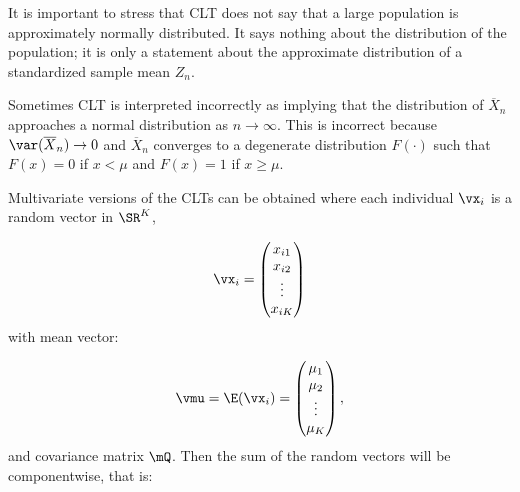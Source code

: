 \documentclass[english,12pt]{book}\usepackage[]{graphicx}\usepackage[]{xcolor}
\begin{document}
It is important to stress that CLT does not say that a large population is approximately normally distributed. It says nothing about the distribution of the population; it is only a statement about the approximate distribution of a standardized sample mean $Z_n$. 

\begin{remark}
  Sometimes CLT is interpreted incorrectly as implying that the distribution of $\overline{X}_n$ approaches a normal distribution as $n\to \infty$. This is incorrect because $\var(\overline{X}_n)\to 0$ and $\overline{X}_n$ converges to a degenerate distribution $F(\cdot)$ such that $F(x) = 0$ if $x < \mu$ and $F(x) = 1$ if $x\geq \mu$.
\end{remark}

Multivariate versions of the CLTs can be obtained where each individual $\vx_i$ is a random vector in $\SR^K$, 


\begin{equation*}
\vx_i =\begin{pmatrix}
        x_{i1}\\
        x_{i2} \\
        \vdots\\
        x_{iK}
      \end{pmatrix}  
\end{equation*}
%
with mean vector:

\begin{equation*}
\vmu = \E(\vx_i) = \begin{pmatrix}
          \mu_1 \\
          \mu_2 \\
          \vdots \\
          \mu_K
       \end{pmatrix},
\end{equation*}
%
and covariance matrix $\mQ$. Then the sum of the random vectors will be componentwise, that is:
\end{document}
